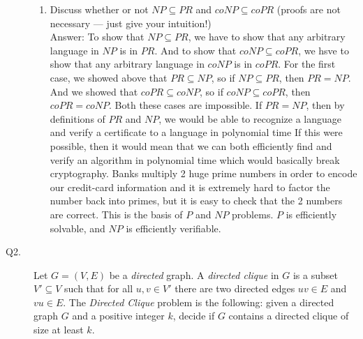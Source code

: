 \documentclass{csc_assignment}
\begin{document}
\begin{description}
\begin{enumerate}

  \item Discuss whether or not $NP \subseteq PR$ and $coNP \subseteq coPR$ (proofs are not necessary --- just give your intuition!)\\
  Answer: To show that $NP \subseteq PR$, we have to show that any arbitrary language in $NP$ is in $PR$. And to show that $coNP \subseteq coPR$, we hsve to show that any arbitrary language in $coNP$ is in $coPR$. For the first case, we showed above that $PR \subseteq NP$, so if $NP \subseteq PR$, then $PR = NP$. And we showed that $coPR \subseteq coNP$, so if $coNP \subseteq coPR$, then $coPR = coNP$. Both these cases are impossible. If $PR = NP$, then by definitions of $PR$ and $NP$, we would be able to recognize a language and verify a certificate to a language in polynomial time If this were possible, then it would mean that we can both efficiently find and verify an algorithm in polynomial time which would basically break cryptography. Banks multiply 2 huge prime numbers in order to encode our credit-card information and it is extremely hard to factor the number back into primes, but it is easy to check that the 2 numbers are correct. This is the basis of $P$ and $NP$ problems. $P$ is efficiently solvable, and $NP$ is efficiently verifiable. 
  \end{enumerate} 
\newpage
\item[Q2.]
Let $G = (V, E)$ be a \emph{directed} graph.
  A \emph{directed clique} in $G$ is a subset $V' \subseteq V$ such that for all $u, v \in V'$ there are two directed edges $uv \in E$ and $vu \in E$.
  The \emph{Directed Clique} problem is the following: given a directed graph $G$ and a positive integer $k$, decide if $G$ contains a directed clique of size at least $k$.


\end{description}
\end{document}
